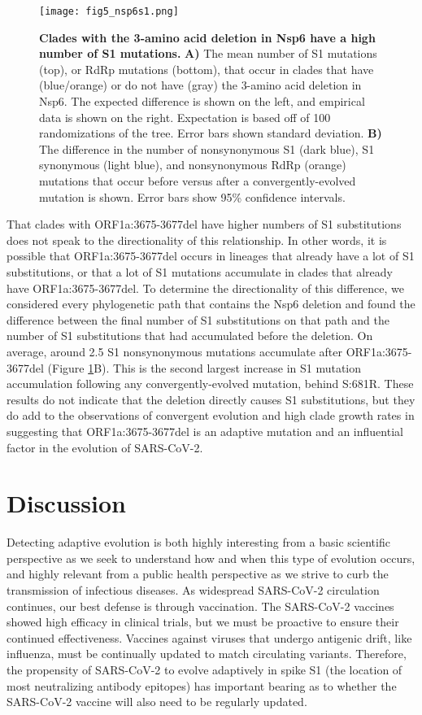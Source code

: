 \documentclass[11pt,oneside,letterpaper]{article}
\begin{document}
\begin{figure}[h!]
	\centerline{\texttt{[image: fig5\_nsp6s1.png]}}
	\caption{\textbf{Clades with the 3-amino acid deletion in Nsp6 have a high number of S1 mutations.}
	\textbf{A)} The mean number of S1 mutations (top), or RdRp mutations (bottom), that occur in clades that have (blue/orange) or do not have (gray) the 3-amino acid deletion in Nsp6.
	The expected difference is shown on the left, and empirical data is shown on the right.
	Expectation is based off of 100 randomizations of the tree. Error bars shown standard deviation.
	\textbf{B)} The difference in the number of nonsynonymous S1 (dark blue), S1 synonymous (light blue), and nonsynonymous RdRp (orange) mutations that occur before versus after a convergently-evolved mutation is shown.
	Error bars show 95\% confidence intervals.
	}
	\label{fig:nsp6s1}
\end{figure}

That clades with ORF1a:3675-3677del have higher numbers of S1 substitutions does not speak to the directionality of this relationship.
In other words, it is possible that ORF1a:3675-3677del occurs in lineages that already have a lot of S1 substitutions, or that a lot of S1 mutations accumulate in clades that already have ORF1a:3675-3677del.
To determine the directionality of this difference, we considered every phylogenetic path that contains the Nsp6 deletion and found the difference between the final number of S1 substitutions on that path and the number of S1 substitutions that had accumulated before the deletion.
On average, around 2.5 S1 nonsynonymous mutations accumulate after ORF1a:3675-3677del (Figure \ref{fig:nsp6s1}B).
This is the second largest increase in S1 mutation accumulation following any convergently-evolved mutation, behind S:681R.
These results do not indicate that the deletion directly causes S1 substitutions, but they do add to the observations of convergent evolution and high clade growth rates in suggesting that ORF1a:3675-3677del is an adaptive mutation and an influential factor in the evolution of SARS-CoV-2.


\section*{Discussion}
Detecting adaptive evolution is both highly interesting from a basic scientific perspective as we seek to understand how and when this type of evolution occurs, and highly relevant from a public health perspective as we strive to curb the transmission of infectious diseases.
As widespread SARS-CoV-2 circulation continues, our best defense is through vaccination.
The SARS-CoV-2 vaccines showed high efficacy in clinical trials, but we must be proactive to ensure their continued effectiveness.
Vaccines against viruses that undergo antigenic drift, like influenza, must be continually updated to match circulating variants.
Therefore, the propensity of SARS-CoV-2 to evolve adaptively in spike S1 (the location of most neutralizing antibody epitopes) has important bearing as to whether the SARS-CoV-2 vaccine will also need to be regularly updated.
\end{document}
